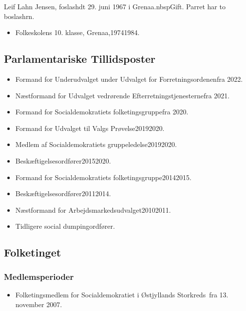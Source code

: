 \documentclass[11pt, a4paper]{awesome-cv}
\begin{document}
\makecvheader[R]
\makelettertitle
\begin{cvletter}
Leif Lahn Jensen, foslashdt 29. juni 1967 i Grenaa.nbspGift. Parret har to boslashrn.

\begin{itemize}
\item Folkeskolens 10. klasse, Grenaa,19741984.
\end{itemize}
\subsection*{Parlamentariske Tillidsposter}
\begin{itemize}
\item Formand for Underudvalget under Udvalget for Forretningsordenenfra 2022.
\item Næstformand for Udvalget vedrørende Efterretningstjenesternefra 2021.
\item Formand for Socialdemokratiets folketingsgruppefra 2020.
\item Formand for Udvalget til Valgs Prøvelse20192020.
\item Medlem af Socialdemokratiets gruppeledelse20192020.
\item Beskæftigelsesordfører20152020.
\item Formand for Socialdemokratiets folketingsgruppe20142015.
\item Beskæftigelsesordfører20112014.
\item Næstformand for Arbejdsmarkedsudvalget20102011.
\item Tidligere social dumpingordfører.
\end{itemize}
\subsection*{Folketinget}
\subsubsection*{Medlemsperioder}
\begin{itemize}
\item Folketingsmedlem for Socialdemokratiet i Østjyllands Storkreds fra 13. november 2007.
\end{itemize}

\end{cvletter}
\end{document}

